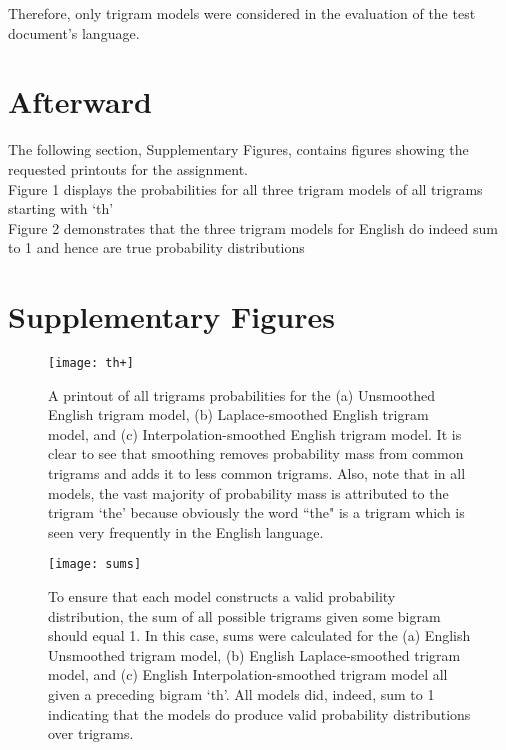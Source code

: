 \documentclass[a4,10pt]{article}
\begin{document}
Therefore, only trigram models were considered in the evaluation of the test document's language.

\section{Afterward}

The following section, Supplementary Figures, contains figures showing the requested printouts for the assignment. \\

Figure 1 displays the probabilities for all three trigram models of all trigrams starting with `th' \\

Figure 2 demonstrates that the three trigram models for English do indeed sum to 1 and hence are true probability distributions



\newpage

\section{Supplementary Figures}

\begin{figure}[hb]
  \centering
  \texttt{[image: th+]}
  \caption {A printout of all trigrams probabilities for the (a) Unsmoothed English trigram model, (b) Laplace-smoothed English trigram model, and (c) Interpolation-smoothed English trigram model. It is clear to see that smoothing removes probability mass from common trigrams and adds it to less common trigrams. Also, note that in all models, the vast majority of probability mass is attributed to the trigram `the' because obviously the word ``the" is a trigram which is seen very frequently in the English language.}
\end{figure}

\newpage

\begin{figure}[hb]
  \centering
  \texttt{[image: sums]}
  \caption {To ensure that each model constructs a valid probability distribution, the sum of all possible trigrams given some bigram should equal 1. In this case, sums were calculated for the (a) English Unsmoothed trigram model, (b) English Laplace-smoothed trigram model, and (c) English Interpolation-smoothed trigram model all given a preceding bigram `th'. All models did, indeed, sum to 1 indicating that the models do produce valid probability distributions over trigrams. }
\end{figure}
\end{document}
